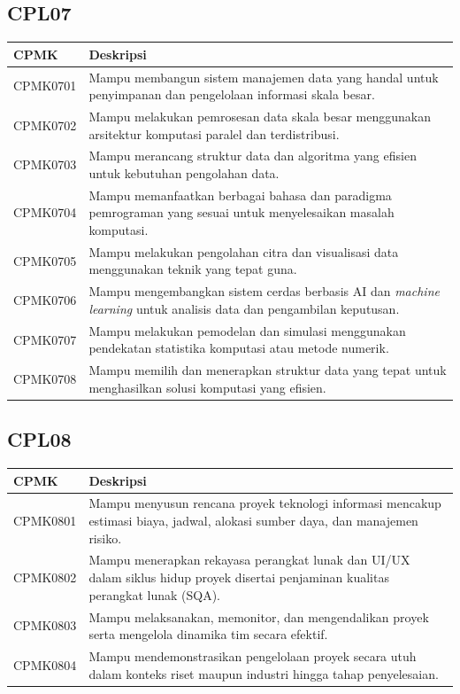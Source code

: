 \subsection{CPL07}
\begin{longtable}{L{2cm}L{12cm}}
\toprule
CPMK & Deskripsi \\
\midrule
\endhead
CPMK0701 & Mampu membangun sistem manajemen data yang handal untuk penyimpanan dan pengelolaan informasi skala besar. \\
CPMK0702 & Mampu melakukan pemrosesan data skala besar menggunakan arsitektur komputasi paralel dan terdistribusi. \\
CPMK0703 & Mampu merancang struktur data dan algoritma yang efisien untuk kebutuhan pengolahan data. \\
CPMK0704 & Mampu memanfaatkan berbagai bahasa dan paradigma pemrograman yang sesuai untuk menyelesaikan masalah komputasi. \\
CPMK0705 & Mampu melakukan pengolahan citra dan visualisasi data menggunakan teknik yang tepat guna. \\
CPMK0706 & Mampu mengembangkan sistem cerdas berbasis AI dan \textit{machine learning} untuk analisis data dan pengambilan keputusan. \\
CPMK0707 & Mampu melakukan pemodelan dan simulasi menggunakan pendekatan statistika komputasi atau metode numerik. \\
CPMK0708 & Mampu memilih dan menerapkan struktur data yang tepat untuk menghasilkan solusi komputasi yang efisien. \\
\bottomrule
\end{longtable}

\subsection{CPL08}
\begin{longtable}{L{2cm}L{12cm}}
\toprule
CPMK & Deskripsi \\
\midrule
\endhead
CPMK0801 & Mampu menyusun rencana proyek teknologi informasi mencakup estimasi biaya, jadwal, alokasi sumber daya, dan manajemen risiko. \\
CPMK0802 & Mampu menerapkan rekayasa perangkat lunak dan UI/UX dalam siklus hidup proyek disertai penjaminan kualitas perangkat lunak (SQA). \\
CPMK0803 & Mampu melaksanakan, memonitor, dan mengendalikan proyek serta mengelola dinamika tim secara efektif. \\
CPMK0804 & Mampu mendemonstrasikan pengelolaan proyek secara utuh dalam konteks riset maupun industri hingga tahap penyelesaian. \\
\bottomrule
\end{longtable}

